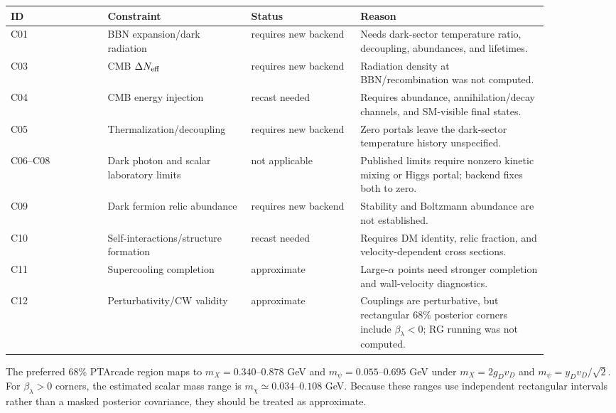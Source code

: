 \documentclass[11pt]{article}
\begin{document}
\begin{longtable}{p{0.16\linewidth}p{0.23\linewidth}p{0.18\linewidth}p{0.31\linewidth}}
\toprule
ID & Constraint & Status & Reason \\
\midrule
C01 & BBN expansion/dark radiation & requires new backend & Needs dark-sector temperature ratio, decoupling, abundances, and lifetimes. \\
C03 & CMB \(\Delta N_{\rm eff}\) & requires new backend & Radiation density at BBN/recombination was not computed. \\
C04 & CMB energy injection & recast needed & Requires abundance, annihilation/decay channels, and SM-visible final states. \\
C05 & Thermalization/decoupling & requires new backend & Zero portals leave the dark-sector temperature history unspecified. \\
C06--C08 & Dark photon and scalar laboratory limits & not applicable & Published limits require nonzero kinetic mixing or Higgs portal; backend fixes both to zero. \\
C09 & Dark fermion relic abundance & requires new backend & Stability and Boltzmann abundance are not established. \\
C10 & Self-interactions/structure formation & recast needed & Requires DM identity, relic fraction, and velocity-dependent cross sections. \\
C11 & Supercooling completion & approximate & Large-\(\alpha\) points need stronger completion and wall-velocity diagnostics. \\
C12 & Perturbativity/CW validity & approximate & Couplings are perturbative, but rectangular 68\% posterior corners include \(\beta_\lambda<0\); RG running was not computed. \\
\bottomrule
\end{longtable}
The preferred 68\% PTArcade region maps to \(m_X=0.340\)--\(0.878\) GeV and \(m_\psi=0.055\)--\(0.695\) GeV under \(m_X=2g_Dv_D\) and \(m_\psi=y_Dv_D/\sqrt2\).  For \(\beta_\lambda>0\) corners, the estimated scalar mass range is \(m_\chi\simeq0.034\)--\(0.108\) GeV.  Because these ranges use independent rectangular intervals rather than a masked posterior covariance, they should be treated as approximate.
\end{document}
